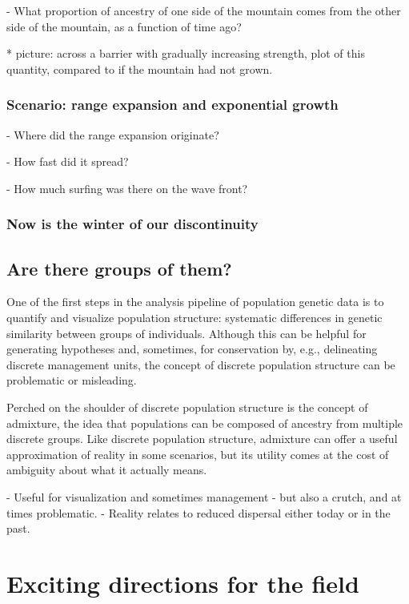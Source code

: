 \documentclass{ar-1col}
\begin{document}
        - What proportion of ancestry of one side of the mountain comes from the other side of the mountain,
            as a function of time ago?

            * picture: across a barrier with gradually increasing strength,
                plot of this quantity, compared to if the mountain had not grown.

\subsubsection{Scenario: range expansion and exponential growth}

        - Where did the range expansion originate?

        - How fast did it spread?

        - How much surfing was there on the wave front?

\subsubsection{Now is the winter of our discontinuity}

\subsection{Are there groups of them?}
One of the first steps in the analysis pipeline of population genetic data
is to quantify and visualize population structure:
systematic differences in genetic similarity between groups of individuals.
Although this can be helpful for generating hypotheses
and, sometimes, for conservation by, e.g., delineating discrete management units,
the concept of discrete population structure
can be problematic or misleading.


Perched on the shoulder of discrete population structure is the concept of admixture,
the idea that populations can be composed of ancestry from multiple discrete groups.
Like discrete population structure,
admixture can offer a useful approximation of reality in some scenarios,
but its utility comes at the cost of ambiguity about what it actually means.

    - Useful for visualization and sometimes management
    - but also a crutch, and at times problematic.
    - Reality relates to reduced dispersal either today or in the past.


\section{Exciting directions for the field}
\end{document}
